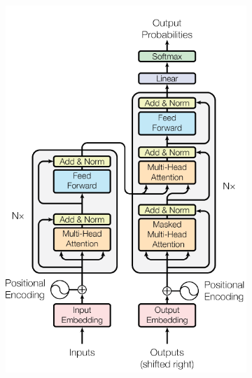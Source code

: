 \begin{figure}[h]
\captionsetup[subfigure]{labelformat=nocaption}
\centering
\begin{subfigure}[b]{0.4\textwidth}
    \centering
    \includegraphics[width=\textwidth]{images/vanilla-arch.png}
    \caption{}
    \label{fig:vanilla-arch}
\end{subfigure}
\begin{subfigure}[b]{0.4\textwidth}
    \centering

\end{subfigure}
\end{figure}
